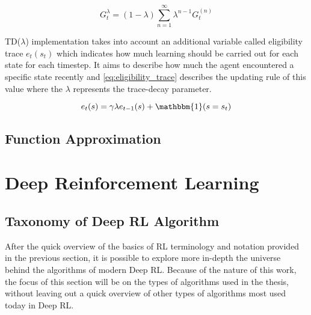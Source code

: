 \begin{equation}\label{eq:lambdaG}
G_t^\lambda = (1-\lambda)\sum_{n=1}^{\infty}\lambda^{n-1}G_t^{(n)}
\end{equation}

TD($\lambda$) implementation takes into account an additional variable called eligibility trace $e_t(s_t)$ which indicates how much learning should be carried out for each state for each timestep. It aims to describe how much the agent encountered a specific state recently and \vref{eq:eligibility_trace} describes the updating rule of this value where the $\lambda$ represents the trace-decay parameter.

\begin{equation}\label{eq:eligibility_trace}
e_t(s) = \gamma \lambda e_{t-1}(s) + \mathbbm{1}(s = s_t)
\end{equation}





\subsection{Function Approximation}

\section{Deep Reinforcement Learning} \label{deepreinflearn}


\subsection{Taxonomy of Deep RL Algorithm}

After the quick overview of the basics of RL terminology and notation provided in the previous section, it is possible to explore more in-depth the universe behind the algorithms of modern Deep RL. Because of the nature of this work, the focus of this section will be on the types of algorithms used in the thesis, without leaving out a quick overview of other types of algorithms most used today in Deep RL.

